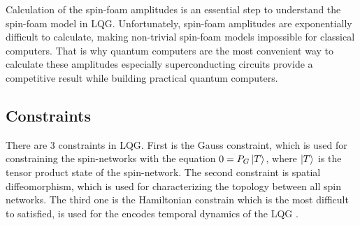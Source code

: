 \documentclass[a4paper,11pt,aps,tightenlines,nofootinbib]{revtex4}
\begin{document}
        Calculation of the spin-foam amplitudes is an essential step to understand the spin-foam model in LQG. Unfortunately, spin-foam amplitudes are 
        exponentially difficult to calculate, making non-trivial spin-foam models impossible for classical computers. That is why quantum computers are 
        the most convenient way to calculate these amplitudes especially superconducting circuits provide a competitive result while building practical quantum computers.

\subsection{Constraints}
        There are 3 constraints in LQG. First is the Gauss constraint, which is used for constraining the spin-networks with the 
        equation $0=P_G \ket{T}$, where $\ket{T}$ is the tensor product state of the spin-network.
        The second constraint is spatial diffeomorphism, which is used for characterizing the topology between all spin networks. 
        The third one is the Hamiltonian constrain which 
        is the most difficult to satisfied, is used for the encodes temporal dynamics of the LQG \cite{diffeo}. 
\end{document}
